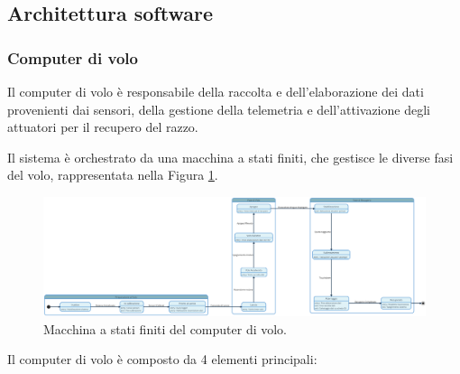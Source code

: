 \documentclass[12pt,a4paper,twoside]{book}
\begin{document}
\subsection{Architettura software}

\subsubsection{Computer di volo}
Il computer di volo è responsabile della raccolta e dell'elaborazione dei dati
provenienti dai sensori, della gestione della telemetria e dell'attivazione degli
attuatori per il recupero del razzo.

Il sistema è orchestrato da una macchina a stati finiti, che gestisce le diverse
fasi del volo, rappresentata nella Figura \ref{fig:flight-computer-fsm}.
\ifdefined\HCode
\else
    \begin{landscape}
        \fi
        \begin{figure}[H]
            \centering
            \vspace*{2cm}  %
            \hspace*{-4cm}
            \includegraphics[width=1.7\textwidth]{img/uml/fsm.png}
            \caption{Macchina a stati finiti del computer di volo.}
            \label{fig:flight-computer-fsm}
            \vspace*{-1cm}  %
        \end{figure}
        \thispagestyle{empty}  %
        \ifdefined\HCode
        \else
    \end{landscape}
\fi

\newpage
Il computer di volo è composto da 4 elementi principali:
\end{document}
